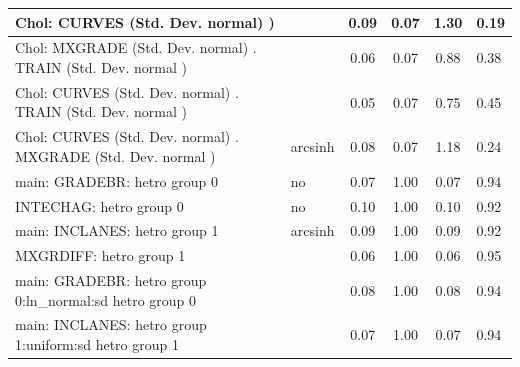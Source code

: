 \begin{table}
\begin{center}
\begin{tabular}{|l|l|c|c|c|l|}
			\hline
			 Chol: CURVES (Std. Dev. normal) ) &  & 0.09 & 0.07 & 1.30 & 0.19 \\
			\hline
			 Chol: MXGRADE (Std. Dev. normal) . TRAIN (Std. Dev.   normal ) &  & 0.06 & 0.07 & 0.88 & 0.38 \\
			\hline
			 Chol: CURVES (Std. Dev. normal) . TRAIN (Std. Dev.   normal ) &  & 0.05 & 0.07 & 0.75 & 0.45 \\
			\hline
			 Chol: CURVES (Std. Dev. normal) . MXGRADE (Std. Dev.   normal ) & arcsinh & 0.08 & 0.07 & 1.18 & 0.24 \\
			\hline
			main: GRADEBR: hetro group 0 & no & 0.07 & 1.00 & 0.07 & 0.94 \\
			\hline
			INTECHAG: hetro group 0 & no & 0.10 & 1.00 & 0.10 & 0.92 \\
			\hline
			main: INCLANES: hetro group 1 & arcsinh & 0.09 & 1.00 & 0.09 & 0.92 \\
			\hline
			MXGRDIFF: hetro group 1 &  & 0.06 & 1.00 & 0.06 & 0.95 \\
			\hline
			main: GRADEBR: hetro group 0:ln_normal:sd  hetro group 0 &  & 0.08 & 1.00 & 0.08 & 0.94 \\
			\hline
			main: INCLANES: hetro group 1:uniform:sd  hetro group 1 &  & 0.07 & 1.00 & 0.07 & 0.94 \\
			\hline
		\end{tabular}
	\end{center}
\end{table}